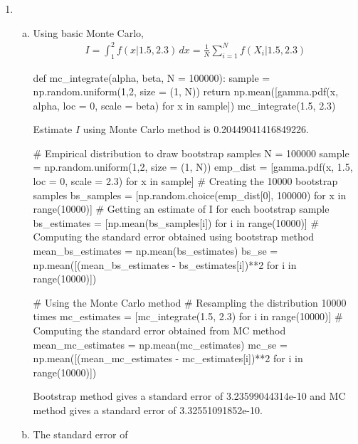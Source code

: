 \documentclass[a4paper,10pt]{article}
\theoremstyle{definition}
\begin{document}
\begin{enumerate}
\begin{lstlisting}[language=R,commentstyle=\fontseries{lc}\color{gray}]
\end{lstlisting}
\item
\begin{enumerate}[(a)]
\item Using basic Monte Carlo,
\begin{align*}
I = \int_{1}^{2}f(x|1.5,2.3) \,dx= \frac{1}{N}\sum_{i=1}^{N}f(X_i|1.5,2.3)
\end{align*}
\begin{python}
def mc_integrate(alpha, beta, N = 100000):
    sample = np.random.uniform(1,2, size = (1, N))
    return np.mean([gamma.pdf(x, alpha, loc = 0, scale = beta) for x in sample])   
mc_integrate(1.5, 2.3)    
\end{python}
Estimate $I$ using Monte Carlo method is 0.20449041416849226.
\begin{python}
# Empirical distribution to draw bootstrap samples
N = 100000
sample = np.random.uniform(1,2, size = (1, N))
emp_dist = [gamma.pdf(x, 1.5, loc = 0, scale = 2.3) for x in sample]
# Creating the 10000 bootstrap samples
bs_samples = [np.random.choice(emp_dist[0], 100000) for x in range(10000)]
# Getting an estimate of I for each bootstrap sample
bs_estimates = [np.mean(bs_samples[i]) for i in range(10000)]
# Computing the standard error obtained using bootstrap method
mean_bs_estimates = np.mean(bs_estimates)
bs_se = np.mean([(mean_bs_estimates - bs_estimates[i])**2 for i in range(10000)])

# Using the Monte Carlo method
# Resampling the distribution 10000 times 
mc_estimates = [mc_integrate(1.5, 2.3) for i in range(10000)]
# Computing the standard error obtained from MC method
mean_mc_estimates = np.mean(mc_estimates)
mc_se = np.mean([(mean_mc_estimates - mc_estimates[i])**2 for i in range(10000)])
\end{python}
Bootstrap method gives a standard error of 3.23599044314e-10 and MC method gives a standard error of 3.32551091852e-10.
\item The standard error of 
\end{enumerate}
\end{enumerate}
\end{document}
